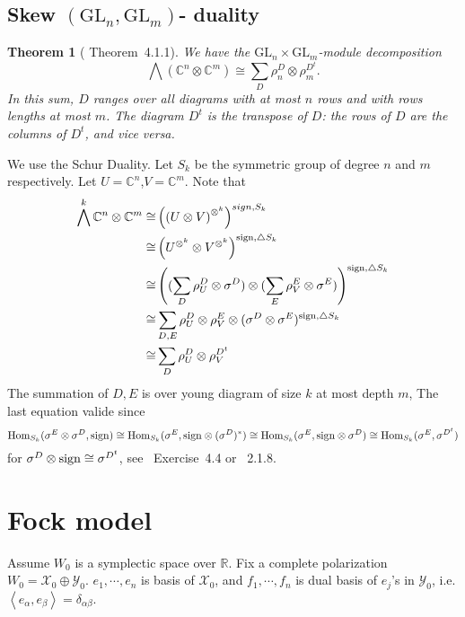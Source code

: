 \documentclass[12pt]{article}
\newtheorem{thm}{Theorem}
\def\sign{{\rm sign}}
\def\Hom{{\rm Hom}}
\def\bR{{\mathbb{R}}}
\def\bC{{\mathbb{C}}}
\def\inn#1#2{\left\langle{#1},{#2}\right\rangle}
\def\cxx{\mathcal{X}}
\def\cyy{\mathcal{Y}}
\def\GL{\mathrm{GL}}
\begin{document}
\subsection{Skew $(\GL_n,\GL_m)$- duality}
\begin{thm}[\cite{Howe1995perspective} Theorem~4.1.1]
We have the $\GL_n\times \GL_m$-module decomposition
\[
\bigwedge ( \bC^n\otimes \bC^m)\cong \sum_{D}\rho^D_n\otimes \rho^{D^t}_m.
\]
In this sum, $D$ ranges over all diagrams with at most $n$ rows 
and with rows lengths at most $m$. The diagram $D^t$ is the transpose 
of $D$: the rows of $D$ are the columns of $D^t$, and vice versa.
\end{thm} 
\proof
We use the Schur Duality. Let $S_k$ be the symmetric group of degree $n$ and
$m$ respectively.
Let $U= \bC^n$,$V=\bC^m$.
Note that 
\[
\begin{split}
\bigwedge^k \bC^n\otimes \bC^m 
\cong&  \left(\left(U\otimes V\right)^{\otimes^k}\right)^{sign,S_k}\\
\cong&  \left(U^{\otimes^k} \otimes V^{\otimes^k}\right)^{\sign,\triangle S_k}\\
\cong& \left((\sum_{D}\rho_U^D\otimes \sigma^D)
  \otimes (\sum_{E}\rho_V^E\otimes\sigma^E)\right)^{\sign,\triangle S_k}\\
\cong& \sum_{D,E} \rho_U^D\otimes \rho_V^E 
\otimes (\sigma^D\otimes \sigma^E)^{\sign,\triangle S_k}\\
\cong& \sum_{D} \rho_U^D\otimes \rho_V^{D^t}
\end{split}
\]
The summation of $D,E$ is over young diagram of size $k$ at most depth $m$, 
The last equation valide since 
\[
\Hom_{S_k}(\sigma^E\otimes \sigma^D, \sign) 
\cong \Hom_{S_k}(\sigma^E, \sign\otimes (\sigma^D)^*)
\cong \Hom_{S_k}(\sigma^E,\sign\otimes \sigma^D)
\cong \Hom_{S_k}(\sigma^E,\sigma^{D^t})
\]
for $\sigma^D\otimes \sign \cong \sigma^{D^t}$, see \cite{Fulton1991}~Exercise~4.4 or \cite{James1981}~2.1.8.  

\section{Fock model}
Assume $W_0$ is a symplectic space over $\bR$.
Fix a complete polarization $W_0 = \cxx_0\oplus \cyy_0$.  
$e_1,\cdots, e_n$ is basis of $\cxx_0$, and $f_1,\cdots, f_n$ is dual basis 
of $e_j$'s in $\cyy_0$, i.e. $\inn{e_\alpha}{e_\beta}=\delta_{\alpha\beta}$.
\end{document}
